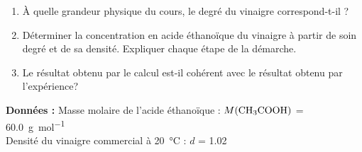 \documentclass[a4paper,11pt,fleqn]{article}%
\begin{document}
\begin{enumerate}[resume]
	\item À quelle grandeur physique du cours, le degré du vinaigre correspond-t-il ?
	\item Déterminer la concentration en acide éthanoïque du vinaigre à partir de soin degré et de sa densité. Expliquer chaque étape de la démarche.
	\item Le résultat obtenu par le calcul est-il cohérent avec le résultat obtenu par l'expérience?
\end{enumerate}

\colorbox{yellow!40}{
\begin{minipage}{.97\textwidth}
\textbf{Données :} 
Masse molaire de l'acide éthanoïque : $M(\ce{CH3COOH})$ = \SI{60,0}{\gram\per\mole}\\
Densité du vinaigre commercial à \SI{20}{\celsius} : $d$ = \num{1,02}
\end{minipage}
}
\end{document}
